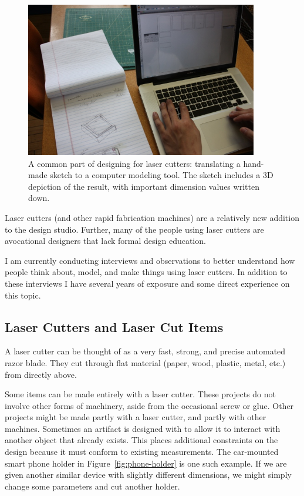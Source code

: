 \documentclass[12pt]{article}
\begin{document}
\begin{figure}[h] %
   \centering
   \includegraphics[width=4in]{img/translate-sketch-to-computer.jpg} 
   \caption{A common part of designing for laser cutters: translating
     a hand-made sketch to a computer modeling tool. The sketch
     includes a 3D depiction of the result, with important dimension
     values written down.}
   \label{fig:translating-to-computer}
\end{figure}

Laser cutters (and other rapid fabrication machines) are a relatively
new addition to the design studio. Further, many of the people using
laser cutters are avocational designers that lack formal design
education.

I am currently conducting interviews and observations to better
understand how people think about, model, and make things using laser
cutters. In addition to these interviews I have several years of
exposure and some direct experience on this topic.

\subsection{Laser Cutters and Laser Cut Items}

A laser cutter can be thought of as a very fast, strong, and precise
automated razor blade. They cut through flat material (paper, wood,
plastic, metal, etc.) from directly above.

Some items can be made entirely with a laser cutter. These projects do
not involve other forms of machinery, aside from the occasional screw
or glue. Other projects might be made partly with a laser cutter, and
partly with other machines. Sometimes an artifact is designed with to
allow it to interact with another object that already exists. This
places additional constraints on the design because it must conform to
existing measurements. The car-mounted smart phone holder in
Figure~\ref{fig:phone-holder} is one such example. If we are given
another similar device with slightly different dimensions, we might
simply change some parameters and cut another holder.
\end{document}
